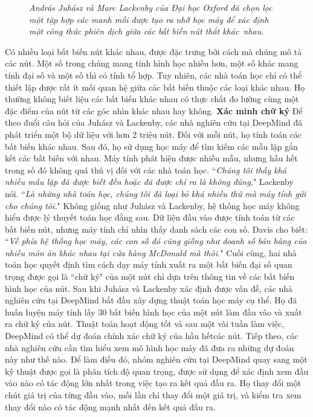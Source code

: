 \begin{multicols}{2}
\begin{figure}[H]
		\caption{\small\textit{\color{duongvaotoanhoc}András Juhász và Marc Lackenby của Đại học Oxford đã chọn lọc  một tập hợp các manh mối được tạo ra nhờ học máy để xác định một công thức phiên dịch giữa các bất biến nút thắt khác~nhau.}}
		\vspace*{-10pt}
	\end{figure}
	Có nhiều loại bất biến nút khác nhau, được đặc trưng bởi cách mà chúng mô tả các nút. Một số trong chúng mang tính hình học nhiều hơn, một số khác mang tính đại số và một số thì có tính tổ hợp. Tuy nhiên, các nhà toán học chỉ có thể thiết lập được rất ít mối quan hệ giữa các bất biến thuộc các loại khác nhau. Họ thường không biết liệu các bất biến khác nhau có thực chất đo lường cùng một đặc điểm của nút từ các góc nhìn khác nhau hay không.
	\vskip 0.05cm
	\textbf{\color{duongvaotoanhoc}Xác minh chữ ký}
	\vskip 0.05cm
	Để theo đuổi câu hỏi của Juhász và Lackenby, các nhà nghiên cứu tại DeepMind đã phát triển một bộ dữ liệu với hơn 2 triệu nút. Đối với mỗi nút, họ tính toán các bất biến khác nhau. Sau đó, họ sử dụng học máy để tìm kiếm các mẫu lặp gắn kết các bất biến với nhau. Máy tính phát hiện được nhiều mẫu, nhưng hầu hết trong số đó không quá thú vị đối với các nhà toán học.
	\vskip 0.05cm
	``\textit{Chúng tôi thấy khá nhiều mẫu lặp đã được biết đến hoặc đã được chỉ ra là không đúng,}" Lackenby nói. ``\textit{Là những nhà toán học, chúng tôi đã loại bỏ khá nhiều thứ mà máy tính gửi cho chúng tôi.}"
	\vskip 0.05cm
	Không giống như Juhász và Lackenby, hệ thống học máy không hiểu được lý thuyết toán học đằng sau. Dữ liệu đầu vào được tính toán từ các bất biến nút, nhưng máy tính chỉ nhìn thấy danh sách các con số.
	\vskip 0.05cm
	Davis cho biết: ``\textit{Về phía hệ thống học máy, các con số đó cũng giống như doanh số bán hàng của nhiều món ăn khác nhau tại cửa hàng McDonald mà thôi.}"
	\vskip 0.05cm
	Cuối cùng, hai nhà toán học quyết định tìm cách dạy máy tính xuất ra một bất biến đại số quan trọng được gọi là ``chữ ký" của một nút chỉ dựa trên thông tin về các bất biến hình học của nút.
	\vskip 0.05cm
	Sau khi Juhász và Lackenby xác định được vấn đề, các nhà nghiên cứu tại DeepMind bắt đầu xây dựng thuật toán học máy cụ thể. Họ đã huấn luyện máy tính lấy $30$ bất biến hình học của một nút làm đầu vào và xuất ra chữ ký của nút. Thuật toán hoạt động tốt và sau một vài tuần làm việc, DeepMind có thể dự đoán chính xác chữ ký của hầu hết\linebreak các nút.
	\vskip 0.05cm
	Tiếp theo, các nhà nghiên cứu cần tìm hiểu xem mô hình học máy đã đưa ra những dự đoán này như thế nào. Để làm điều đó, nhóm nghiên cứu tại DeepMind quay sang một kỹ thuật được gọi là phân tích độ quan trọng, được sử dụng để xác định xem đầu vào nào có tác động lớn nhất trong việc tạo ra kết quả đầu ra. Họ thay đổi một chút giá trị của từng đầu vào, mỗi lần chỉ thay đổi một giá trị, và kiểm tra xem thay đổi nào có tác động mạnh nhất đến kết quả đầu ra.

\end{multicols}
